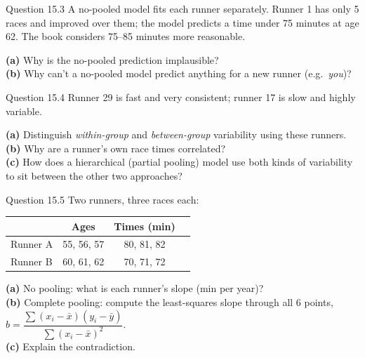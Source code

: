 \documentclass[aspectratio=43,11pt]{beamer}
\begin{document}
\begin{frame}{Question 15.3}
  A no-pooled model fits each runner separately. Runner 1 has only 5
  races and improved over them; the model predicts a time under 75
  minutes at age 62. The book considers 75--85 minutes more reasonable.
  \vspace{0.6em}

  \textbf{(a)} Why is the no-pooled prediction implausible? \\[0.3em]
  \textbf{(b)} Why can't a no-pooled model predict anything for a new
  runner (e.g.\ \emph{you})?
\end{frame}

\begin{frame}{Question 15.4}
  Runner 29 is fast and very consistent; runner 17 is slow and highly
  variable.
  \vspace{0.6em}

  \textbf{(a)} Distinguish \emph{within-group} and \emph{between-group}
  variability using these runners. \\[0.3em]
  \textbf{(b)} Why are a runner's own race times correlated? \\[0.3em]
  \textbf{(c)} How does a hierarchical (partial pooling) model use both
  kinds of variability to sit between the other two approaches?
\end{frame}

\begin{frame}{Question 15.5}
  Two runners, three races each:
  \vspace{0.3em}
  \begin{center}
  \begin{tabular}{@{}lccc@{}}
    \toprule
    & Ages & Times (min) & \\
    \midrule
    Runner A & 55, 56, 57 & 80, 81, 82 & \\
    Runner B & 60, 61, 62 & 70, 71, 72 & \\
    \bottomrule
  \end{tabular}
  \end{center}
  \textbf{(a)} No pooling: what is each runner's slope (min per year)? \\[0.3em]
  \textbf{(b)} Complete pooling: compute the least-squares slope through
  all 6 points,
  $b = \dfrac{\sum (x_i - \bar x)(y_i - \bar y)}{\sum (x_i - \bar x)^2}$.
  \\[0.3em]
  \textbf{(c)} Explain the contradiction.
\end{frame}
\end{document}
